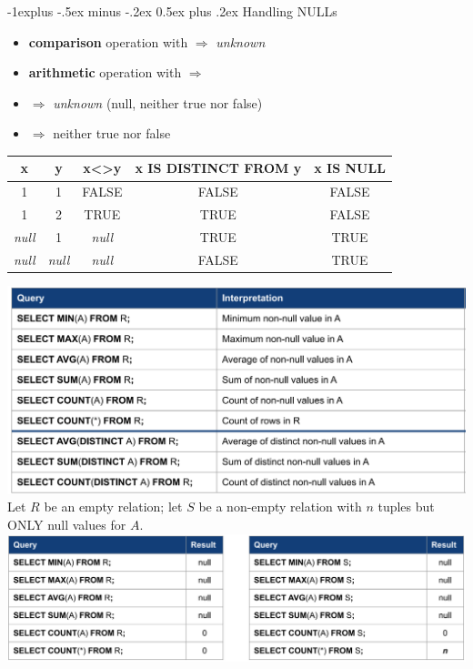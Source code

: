 \documentclass[10pt, landscape]{article}
\makeatletter
\renewcommand{\subsection}{\@startsection{subsection}{2}{0mm}%
  {-1explus -.5ex minus -.2ex}%
  {0.5ex plus .2ex}%
{\normalfont\normalsize\bfseries}}
\makeatother
\begin{document}
\begin{multicols}{4}
  \subsection{Handling NULLs}
  \begin{itemize}
    \item \textbf{comparison} operation with  $\Rightarrow$ \textit{unknown}
    \item \textbf{arithmetic} operation with  $\Rightarrow$ 
    \item {} $\Rightarrow$ \textit{unknown} (null, neither true nor false)
    \item {} $\Rightarrow$ neither true nor false
  \end{itemize}
  \begin{tightcenter}
    \scriptsize{\begin{tabular}
        {ccccc}
        \rowcolor{cyan!10} 
        \textbf{x} & \textbf{y} & x<>y & x IS DISTINCT FROM y & x IS NULL \\ \hline 
        1 & 1 & FALSE & FALSE & FALSE \\ 
        1 & 2 & TRUE & TRUE & FALSE \\
        \textit{null} & 1 & \textit{null} & TRUE & TRUE \\
        \textit{null} & \textit{null} & \textit{null} & FALSE & TRUE \\
        \hline
      \end{tabular}
    }
    \includegraphics[width=0.95\linewidth]{cs2102-aggregation-functions-summary.png} 
    \\ Let $R$ be an empty relation; let $S$ be a non-empty relation with $n$ tuples but ONLY null values for $A$.
    \includegraphics[width=0.95\linewidth]{cs2102-aggregation-function-null.png} 
  \end{tightcenter}



\end{multicols}
\end{document}

